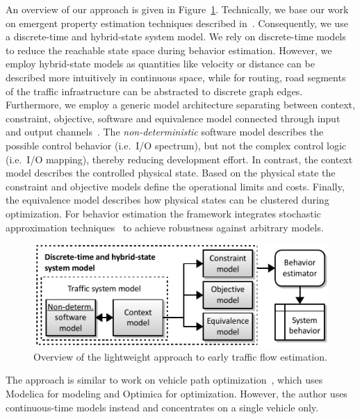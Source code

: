 \documentclass[conference]{../cls/IEEEtran}
\begin{document}

An overview of our approach is given in Figure~\ref{fig:framework}. Technically,
we base our work on emergent property estimation techniques described
in~\cite{Hackenberg2012}. Consequently, we use a discrete-time and
hybrid-state system model. We rely on discrete-time models to reduce the reachable state space during behavior estimation. However, we employ hybrid-state models as quantities like velocity or distance can be described more intuitively in continuous space, while for routing, road segments of the traffic infrastructure can be abstracted to discrete graph edges. Furthermore, we employ a generic model architecture separating between context, constraint, objective, software and equivalence model connected through input and output channels~\cite{Hackenberg2014}. The \textit{non-deterministic} software model describes the possible control behavior (i.e.\ I/O spectrum), but not the complex control logic (i.e.\ I/O mapping), thereby reducing development effort. In contrast, the context model describes the controlled physical state. Based on the physical state the constraint and objective models define the operational limits and costs. Finally, the equivalence model describes how physical states can be clustered during optimization. For behavior estimation the framework integrates stochastic approximation techniques~\cite{Pereira1991} to achieve robustness against arbitrary models.

\begin{figure}[h]
	\centering
	\includegraphics{../gfx/framework.pdf}
	\caption{Overview of the lightweight approach to early traffic flow estimation.}
	\label{fig:framework}
\end{figure}

The approach is similar to work on vehicle path optimization~\cite{Danielsson2007}, which uses Modelica for modeling and Optimica for optimization. However, the author uses continuous-time models instead and concentrates on a single vehicle only.
\end{document}
